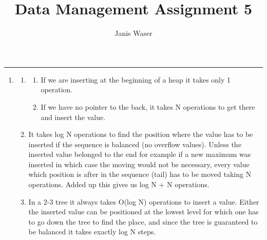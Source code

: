 \documentclass[12pt]{extarticle}
\title{Data Management Assignment 5}
\author{Janis Waser}
\begin{document}
\maketitle \vspace{-10mm}
\rule{\linewidth}{0.4pt}


\begin{flushleft}
\begin{enumerate}[label=\textbf{\Alph*.}]

\item 
\begin{enumerate}[label=\arabic*)]
\item \begin{enumerate}[label=(\alph*)]
\item If we are inserting at the beginning of a heap it takes only 1 operation. 
\item If we have no pointer to the back, it takes N operations to get there and insert the value.
\end{enumerate}
\item It takes log N operations to find the position where the value has to be inserted if the sequence is balanced (no overflow values). Unless the inserted value belonged to the end for example if a new maximum was inserted in which case the moving would not be necessary, every value which position is after in the sequence (tail) has to be moved taking N operations.  Added up this gives us log N + N operations. 
\item In a 2-3 tree it always takes O(log N) operations to insert a value. Either the inserted value can be positioned at the lowest level for which one has to go down the tree to find the place, and since the tree is guaranteed to be balanced it takes exactly log N steps.


\end{enumerate}
\end{enumerate}
\end{flushleft}
\end{document}
